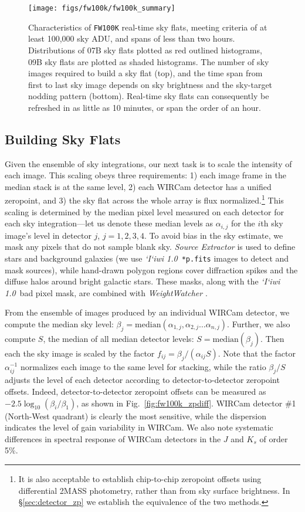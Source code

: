 \documentclass[iop]{emulateapj}
\newcommand{\sw}[1]{\textit{#1}} %
\newcommand{\iiwione}{\sw{`I`iwi 1.0}}
\newcommand{\Fig}[1]{Fig.~\ref{fig:#1}}  %
\newcommand{\Sec}[1]{\S\ref{sec:#1}}  %
\begin{document}
\begin{figure}[t]
\centering
\texttt{[image: figs/fw100k/fw100k\_summary]}
\caption{Characteristics of \texttt{FW100K} real-time sky flats, meeting criteria of at least 100,000 sky ADU, and spans of less than two hours.
Distributions of 07B sky flats plotted as red outlined histograms, 09B sky flats are plotted as shaded histograms.
The number of sky images required to build a sky flat (top), and the time span from first to last sky image depends on sky brightness and the sky-target nodding pattern (bottom).
Real-time sky flats can consequently be refreshed in as little as 10 minutes, or span the order of an hour.}
\label{fig:fw100k_summary}
\end{figure}

\subsection{Building Sky Flats}
\label{sec:flatbuilding}

Given the ensemble of sky integrations, our next task is to scale the intensity of each image.
This scaling obeys three requirements: 1) each image frame in the median stack is at the same level, 2) each WIRCam detector has a unified zeropoint, and 3) the sky flat across the whole array is flux normalized.\footnote{It is also acceptable to establish chip-to-chip zeropoint offsets using differential 2MASS photometry, rather than from sky surface brightness. In \Sec{detector_zp} we establish the equivalence of the two methods.}
This scaling is determined by the median pixel level measured on each detector for each sky integration---let us denote these median levels as $\alpha_{i,j}$ for the $i$th sky image's level in detector $j$, $j=1, 2, 3, 4$.
To avoid bias in the sky estimate, we mask any pixels that do not sample blank sky.
\sw{Source Extractor} \citep{Bertin:1996} is used to define stars and background galaxies (we use \iiwione\ \texttt{*p.fits} images to detect and mask sources), while hand-drawn polygon regions cover diffraction spikes and the diffuse halos around bright galactic stars. These masks, along with the \iiwione\ bad pixel mask, are combined with \sw{WeightWatcher} \citep{Marmo:2008}.

From the ensemble of images produced by an individual WIRCam detector, we compute the median sky level: $\beta_j = \mathrm{median}(\alpha_{1,j}, \alpha_{2,j}\ldots \alpha_{n,j} )$.
Further, we also compute $S$, the median of all median detector levels: $S=\mathrm{median}(\beta_j)$.
Then each the sky image is scaled by the factor $f_{ij} = \beta_j / (\alpha_{ij} S)$.
Note that the factor $\alpha_{ij}^{-1}$ normalizes each image to the same level for stacking, while the ratio $\beta_j / S$ adjusts the level of each detector according to detector-to-detector zeropoint offsets.
Indeed, detector-to-detector zeropoint offsets can be measured as $-2.5 \log_{10}(\beta_i / \beta_1)$, as shown in \Fig{fw100k_zpdiff}.
WIRCam detector \#1 (North-West quadrant) is clearly the most sensitive, while the dispersion indicates the level of gain variability in WIRCam.
We also note systematic differences in spectral response of WIRCam detectors in the $J$ and $K_s$ of order 5\%.
\end{document}
